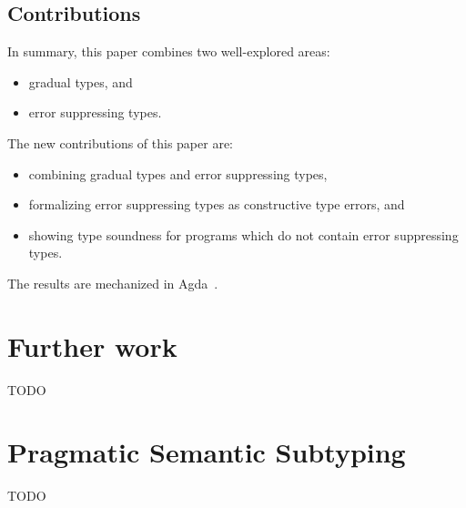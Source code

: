 \documentclass[acmsmall,review,screen]{acmart}
\begin{document}
\subsection{Contributions}

In summary, this paper combines two well-explored areas:
\begin{itemize}
  \item gradual types, and
  \item error suppressing types.
\end{itemize}
The new contributions of this paper are:
\begin{itemize}
  \item combining gradual types and error suppressing types,
  \item formalizing error suppressing types as constructive type errors, and
  \item showing type soundness for programs which do not contain error
    suppressing types.
\end{itemize}
The results are mechanized in Agda~.


\section{Further work}

TODO

\appendix

\section{Pragmatic Semantic Subtyping}
\label{app:semsub}

TODO



\end{document}
